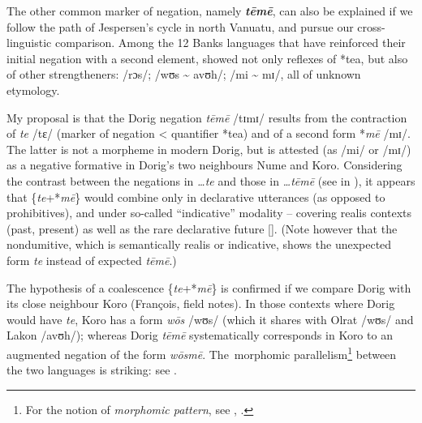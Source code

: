 \documentclass[output=paper,colorlinks,citecolor=brown,draft]{langscibook}
\begin{document}
The other common marker of negation, namely \textbf{\textit{tēmē}}, can also be explained if we follow the path of Jespersen’s cycle in north Vanuatu, and pursue our cross-linguistic comparison. Among the 12 Banks languages that have reinforced their initial negation with a second element,  showed not only reflexes of *tea, but also of other strengtheners: /rɔs/; /wʊs {\textasciitilde} avʊh/; /mi {\textasciitilde} mɪ/, all of unknown etymology. 

My proposal is that the Dorig negation \textit{tēmē} /tɪmɪ/ results from the contraction of \textit{te} /tɛ/ (marker of negation < quantifier *tea) and of a second form *\textit{mē} /mɪ/. The latter is not a morpheme in modern Dorig, but is attested (as /mi/ or /mɪ/) as a negative formative in Dorig’s two neighbours Nume and Koro. Considering the contrast between the negations in \textit{…te} and those in \textit{…tēmē} (see  in ), it appears that \{\textit{te}+*\textit{mē}\} would combine only in declarative utterances (as opposed to prohibitives), and under so-called “indicative” modality – covering realis contexts (past, present) as well as the rare declarative future []. (Note however that the nondumitive, which is semantically realis or indicative, shows the unexpected form \textit{te} instead of expected \textit{tēmē}.)

The hypothesis of a coalescence \{\textit{te}+*\textit{mē}\} is confirmed if we compare Dorig with its close neighbour Koro (François, field notes). In those contexts where Dorig would have \textit{te}, Koro has a form \textit{wōs} /wʊs/ (which it shares with Olrat /wʊs/ and Lakon /avʊh/); whereas Dorig \textit{tēmē} systematically corresponds in Koro to an augmented negation of the form \textit{wōsmē}. The~morphomic parallelism\footnote{For the notion of \textit{morphomic pattern}, see \citet{Aronoff1994}, \citet{Maiden2005}.} between the two languages is striking: see .
\end{document}
